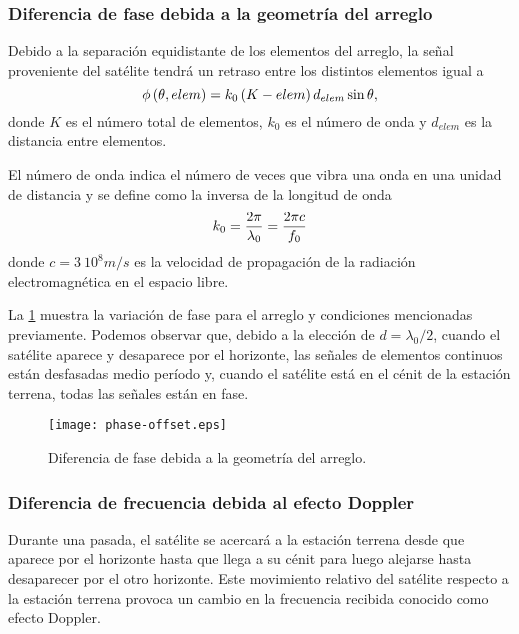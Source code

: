 \documentclass{article}
\newenvironment{standalone}{\begin{preview}}{\end{preview}}
\begin{document}
\begin{standalone}
  \subsubsection{Diferencia de fase debida a la geometría del arreglo}

  Debido a la separación equidistante de los elementos del arreglo, la señal proveniente del satélite tendrá un retraso entre los distintos elementos igual a \cite[126]{visser2005}
  \begin{equation}
    \phi \left( \theta, elem \right) = k_0 \left( K - elem \right) d_{elem} \sin{\theta},
    \tagaddtext{[\si{\radian}]}
  \end{equation}
  donde $K$ es el número total de elementos, $k_0$ es el número de onda y $d_{elem}$ es la distancia entre elementos.

  El número de onda indica el número de veces que vibra una onda en una unidad de distancia y se define como la inversa de la longitud de onda
  \begin{equation}
    k_0 = \frac{2\pi}{\lambda_{0}} = \frac{2\pi c}{f_0}
    \tagaddtext{[\si{\radian\per\meter}]}
  \end{equation}
  donde $c = 3 \ 10^8 m/s$ es la velocidad de propagación de la radiación electromagnética en el espacio libre.

  La \cref{fig:phase-offset} muestra la variación de fase para el arreglo y condiciones mencionadas previamente. Podemos observar que, debido a la elección de $d = \lambda_0 / 2$, cuando el satélite aparece y desaparece por el horizonte, las señales de elementos continuos están desfasadas medio período y, cuando el satélite está en el cénit de la estación terrena, todas las señales están en fase.

  \begin{figure}[!htbp]
    \centering
    \texttt{[image: phase-offset.eps]}
    \caption{Diferencia de fase debida a la geometría del arreglo.}
    \label{fig:phase-offset}
  \end{figure}

  \subsubsection{Diferencia de frecuencia debida al efecto Doppler}

  Durante una pasada, el satélite se acercará a la estación terrena desde que aparece por el horizonte hasta que llega a su cénit para luego alejarse hasta desaparecer por el otro horizonte. Este movimiento relativo del satélite respecto a la estación terrena provoca un cambio en la frecuencia recibida conocido como efecto Doppler.


\end{standalone}
\end{document}
